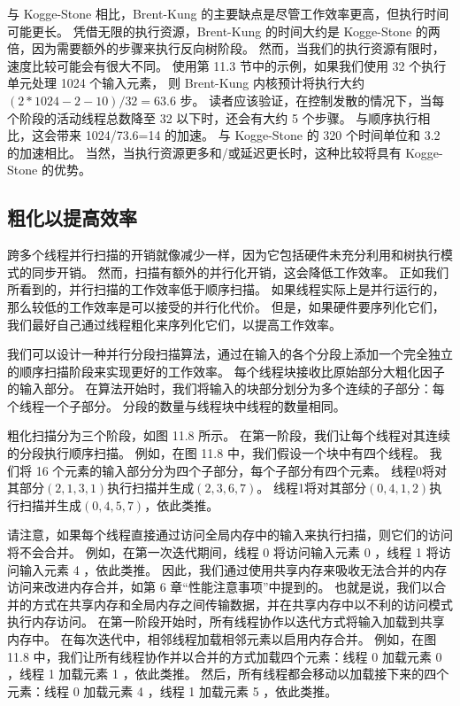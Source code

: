 与 Kogge-Stone 相比，Brent-Kung 的主要缺点是尽管工作效率更高，但执行时间可能更长。 
凭借无限的执行资源，Brent-Kung 的时间大约是 Kogge-Stone 的两倍，因为需要额外的步骤来执行反向树阶段。 
然而，当我们的执行资源有限时，速度比较可能会有很大不同。 
使用第 11.3 节中的示例，如果我们使用 32 个执行单元处理 1024 个输入元素，
则 Brent-Kung 内核预计将执行大约 $(2 * 1024-2-10) / 32=63.6$ 步。 
读者应该验证，在控制发散的情况下，当每个阶段的活动线程总数降至 32 以下时，还会有大约 5 个步骤。 
与顺序执行相比，这会带来 1024/73.6=14 的加速。 与 Kogge-Stone 的 320 个时间单位和 3.2 的加速相比。 
当然，当执行资源更多和/或延迟更长时，这种比较将具有 Kogge-Stone 的优势。

\subsection{粗化以提高效率}
跨多个线程并行扫描的开销就像减少一样，因为它包括硬件未充分利用和树执行模式的同步开销。 
然而，扫描有额外的并行化开销，这会降低工作效率。 正如我们所看到的，并行扫描的工作效率低于顺序扫描。 
如果线程实际上是并行运行的，那么较低的工作效率是可以接受的并行化代价。 
但是，如果硬件要序列化它们，我们最好自己通过线程粗化来序列化它们，以提高工作效率。

我们可以设计一种并行分段扫描算法，通过在输入的各个分段上添加一个完全独立的顺序扫描阶段来实现更好的工作效率。 
每个线程块接收比原始部分大粗化因子的输入部分。 
在算法开始时，我们将输入的块部分划分为多个连续的子部分：每个线程一个子部分。 分段的数量与线程块中线程的数量相同。

粗化扫描分为三个阶段，如图 11.8 所示。 在第一阶段，我们让每个线程对其连续的分段执行顺序扫描。 
例如，在图 11.8 中，我们假设一个块中有四个线程。 我们将 16 个元素的输入部分分为四个子部分，每个子部分有四个元素。 
线程0将对其部分$(2,1,3,1)$执行扫描并生成$(2,3,6,7)$。 
线程1将对其部分$(0,4,1,2)$执行扫描并生成$(0,4,5,7)$，依此类推。

请注意，如果每个线程直接通过访问全局内存中的输入来执行扫描，则它们的访问将不会合并。 
例如，在第一次迭代期间，线程 0 将访问输入元素 0 ，线程 1 将访问输入元素 4 ，依此类推。 
因此，我们通过使用共享内存来吸收无法合并的内存访问来改进内存合并，如第 6 章“性能注意事项”中提到的。 
也就是说，我们以合并的方式在共享内存和全局内存之间传输数据，并在共享内存中以不利的访问模式执行内存访问。 
在第一阶段开始时，所有线程协作以迭代方式将输入加载到共享内存中。 在每次迭代中，相邻线程加载相邻元素以启用内存合并。 
例如，在图 11.8 中，我们让所有线程协作并以合并的方式加载四个元素：线程 0 加载元素 0 ，线程 1 加载元素 1 ，依此类推。 
然后，所有线程都会移动以加载接下来的四个元素：线程 0 加载元素 4 ，线程 1 加载元素 5 ，依此类推。

